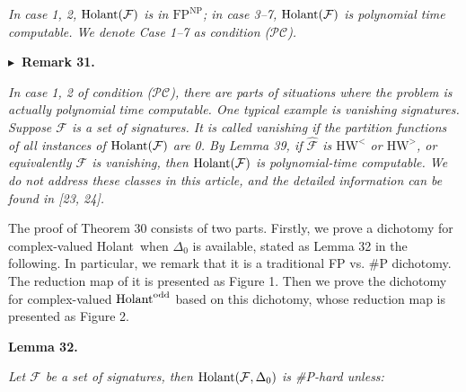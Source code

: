 \documentclass[10pt,a4paper]{article}
\begin{document}
\emph{In case 1, 2, $\textup{{Holant}}(\mathcal{F})$ is in $\text{FP}^{\text{NP}}$; in case 3–7, $\textup{{Holant}}(\mathcal{F})$ is polynomial time computable. We denote Case 1–7 as condition ($\mathcal{PC}$).}\par








\par\medskip\noindent\textbf{
$\blacktriangleright$ Remark 31.
}\par



\emph{In case 1, 2 of condition ($\mathcal{PC}$), there are parts of situations where the problem is actually polynomial time computable. One typical example is vanishing signatures. Suppose $\mathcal{F}$ is a set of signatures. It is called vanishing if the partition functions of all instances of $\textup{{Holant}}(\mathcal{F})$ are 0. By Lemma 39, if $\widehat{\mathcal{F}}$ is $\text{HW}^{<}$ or $\text{HW}^{>}$, or equivalently $\mathcal{F}$ is vanishing, then $\textup{{Holant}}(\mathcal{F})$ is polynomial-time computable. We do not address these classes in this article, and the detailed information can be found in [23, 24].}\par






The proof of Theorem 30 consists of two parts. Firstly, we prove a dichotomy for complex-valued Holant when $\Delta_{0}$ is available, stated as Lemma 32 in the following. In particular, we remark that it is a traditional FP vs. \#P dichotomy. The reduction map of it is presented as Figure 1. Then we prove the dichotomy for complex-valued $\textup{{Holant}}^{\text{odd}}$ based on this dichotomy, whose reduction map is presented as Figure 2.\par





\par\medskip\noindent\textbf{
\textbf{Lemma 32}\textbf{.}
}\par



\emph{Let $\mathcal{F}$ be a set of signatures, then $\textup{{Holant}}(\mathcal{F},\Delta_{0})$ is \#P-hard unless:}\par
\end{document}
